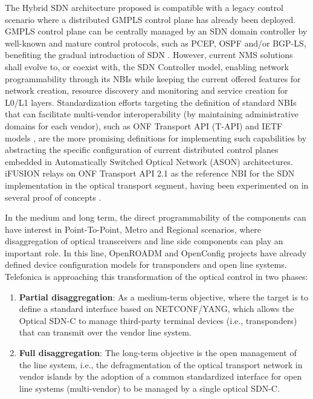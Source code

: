 \documentclass[a4paper,fleqn]{cas-dc}
\begin{document}
The Hybrid SDN architecture proposed is compatible with a legacy control scenario where a distributed GMPLS control plane has already been deployed. GMPLS control plane can be centrally managed by an SDN domain controller by well-known and mature control protocols, such as PCEP, OSPF and/or BGP-LS, benefiting the gradual introduction of SDN \cite{lopez2018control}. However, current NMS solutions shall evolve to, or coexist with, the SDN Controller model, enabling network programmability through its NBIs while keeping the current offered features for network creation, resource discovery and monitoring and service creation for L0/L1 layers. Standardization efforts targeting the definition of standard NBIs that can facilitate multi-vendor interoperability (by maintaining administrative domains for each vendor), such as ONF Transport API (T-API) \cite{lopez2016transport} and IETF models \cite{wu2017service}, are the more promising definitions for implementing such capabilities by abstracting the specific configuration of current distributed control planes embedded in Automatically Switched Optical Network (ASON) architectures. 
iFUSION relays on ONF Transport API 2.1 as the reference NBI for the SDN implementation in the optical transport segment, having been experimented on in several proof of concepts \cite{mayoral2016first,mayoral2017control,bravalheri2019vnf}. 

In the medium and long term, the direct programmability of the components can have interest in Point-To-Point, Metro and Regional scenarios, where disaggregation of optical transceivers and line side components can play an important role. In this line, OpenROADM \cite{oda2016learning,kundrat2019opening} and OpenConfig \cite{Openconfig,shaikhopenconfig} projects have already defined device configuration models for transponders and open line systems. Telefonica is approaching this transformation of the optical control in two phases:

\begin{enumerate}
    \item \textbf{Partial disaggregation}: As a medium-term objective, where the target is to define a standard interface based on NETCONF/YANG, which allows the Optical SDN-C to manage third-party terminal devices (i.e., transponders) that can transmit over the vendor line system.
    
    \item \textbf{Full disaggregation}: The long-term objective is the open management of the line system, i.e., the defragmentation of the optical transport network in vendor islands by the adoption of a common standardized interface for open line systems (multi-vendor) to be managed by a single optical SDN-C.
\end{enumerate}
\end{document}
